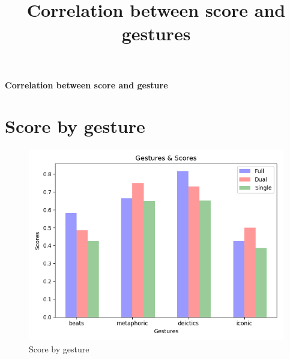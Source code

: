 \documentclass[11pt]{article}
\begin{document}
\title{Correlation between score and gestures}

\thispagestyle{empty}

\begin{center}
    {\LARGE \bf Correlation between score and gesture}\\
\end{center}

\section{Score by gesture}
\begin{figure}[H]
    \centering
    \includegraphics[scale=1]{correlation}
    \caption{Score by gesture}
    \label{}
\end{figure}
\end{document}
